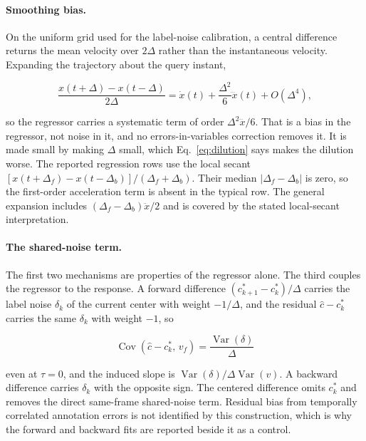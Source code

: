 \documentclass[10pt,twocolumn,letterpaper]{article}
\begin{document}
\paragraph{Smoothing bias.} On the uniform grid used for the label-noise
calibration, a central difference returns the mean velocity over $2\Delta$
rather than the instantaneous velocity. Expanding the trajectory about the
query instant,

\begin{equation}
\frac{x(t+\Delta)-x(t-\Delta)}{2\Delta}
=\dot{x}(t)+\frac{\Delta^{2}}{6}\dddot{x}(t)+O(\Delta^{4}),
\end{equation}

so the regressor carries a systematic term of order $\Delta^{2}\dddot{x}/6$. That
is a bias in the regressor, not noise in it, and no errors-in-variables
correction removes it. It is made small by making $\Delta$ small, which
Eq.~\ref{eq:dilution} says makes the dilution worse.
The reported regression rows use the local secant
$[x(t+\Delta_f)-x(t-\Delta_b)]/(\Delta_f+\Delta_b)$. Their median
$|\Delta_f-\Delta_b|$ is zero, so the first-order acceleration term is absent
in the typical row. The general expansion includes
$(\Delta_f-\Delta_b)\ddot{x}/2$ and is covered by the stated local-secant
interpretation.

\paragraph{The shared-noise term.} The first two mechanisms are properties of the
regressor alone. The third couples the regressor to the response. A forward
difference $(c^{*}_{k+1}-c^{*}_{k})/\Delta$ carries the label noise $\delta_{k}$ of
the current center with weight $-1/\Delta$, and the residual
$\hat{c}-c^{*}_{k}$ carries the same $\delta_{k}$ with weight $-1$, so

\begin{equation}
\operatorname{Cov}\!\left(\hat{c}-c^{*}_{k},\,v_{f}\right)=\frac{\operatorname{Var}(\delta)}{\Delta}
\label{eq:shared}
\end{equation}

\noindent even at $\tau=0$, and the induced slope is
$\operatorname{Var}(\delta)/\Delta\operatorname{Var}(v)$. A backward difference
carries $\delta_{k}$ with the opposite sign. The centered difference omits
$c^{*}_{k}$ and removes the direct same-frame shared-noise term. Residual bias
from temporally correlated annotation errors is not identified by this
construction, which is why the forward and backward fits are reported beside it
as a control.
\end{document}
